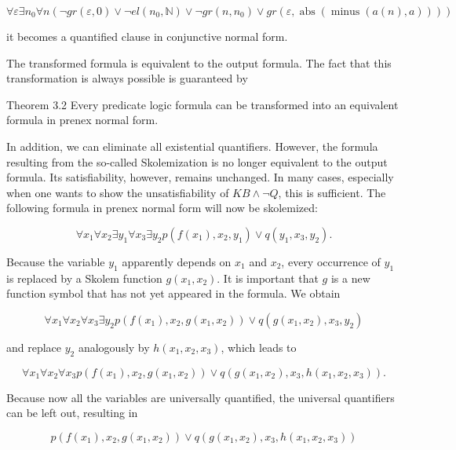 \documentclass[10pt]{book}
\begin{document}
$$
\forall \varepsilon \exists n_{0} \forall n\left(\neg g r(\varepsilon, 0) \vee \neg e l\left(n_{0}, \mathbb{N}\right) \vee \neg g r\left(n, n_{0}\right) \vee g r(\varepsilon, \operatorname{abs}(\operatorname{minus}(a(n), a)))\right)
$$

it becomes a quantified clause in conjunctive normal form.

The transformed formula is equivalent to the output formula. The fact that this transformation is always possible is guaranteed by

Theorem 3.2 Every predicate logic formula can be transformed into an equivalent formula in prenex normal form.

In addition, we can eliminate all existential quantifiers. However, the formula resulting from the so-called Skolemization is no longer equivalent to the output formula. Its satisfiability, however, remains unchanged. In many cases, especially when one wants to show the unsatisfiability of $K B \wedge \neg Q$, this is sufficient. The following formula in prenex normal form will now be skolemized:

$$
\forall x_{1} \forall x_{2} \exists y_{1} \forall x_{3} \exists y_{2} p\left(f\left(x_{1}\right), x_{2}, y_{1}\right) \vee q\left(y_{1}, x_{3}, y_{2}\right) .
$$

Because the variable $y_{1}$ apparently depends on $x_{1}$ and $x_{2}$, every occurrence of $y_{1}$ is replaced by a Skolem function $g\left(x_{1}, x_{2}\right)$. It is important that $g$ is a new function symbol that has not yet appeared in the formula. We obtain

$$
\forall x_{1} \forall x_{2} \forall x_{3} \exists y_{2} p\left(f\left(x_{1}\right), x_{2}, g\left(x_{1}, x_{2}\right)\right) \vee q\left(g\left(x_{1}, x_{2}\right), x_{3}, y_{2}\right)
$$

and replace $y_{2}$ analogously by $h\left(x_{1}, x_{2}, x_{3}\right)$, which leads to

$$
\forall x_{1} \forall x_{2} \forall x_{3} p\left(f\left(x_{1}\right), x_{2}, g\left(x_{1}, x_{2}\right)\right) \vee q\left(g\left(x_{1}, x_{2}\right), x_{3}, h\left(x_{1}, x_{2}, x_{3}\right)\right) .
$$

Because now all the variables are universally quantified, the universal quantifiers can be left out, resulting in

$$
p\left(f\left(x_{1}\right), x_{2}, g\left(x_{1}, x_{2}\right)\right) \vee q\left(g\left(x_{1}, x_{2}\right), x_{3}, h\left(x_{1}, x_{2}, x_{3}\right)\right)
$$
\end{document}
